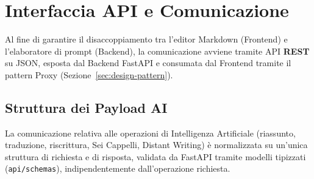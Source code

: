 \section{Interfaccia API e Comunicazione}
\label{sec:interfaccia-api}

Al fine di garantire il disaccoppiamento tra l'editor Markdown (Frontend) e l'elaboratore di prompt (Backend), la comunicazione avviene tramite API \textbf{REST} su JSON, esposta dal Backend FastAPI e consumata dal Frontend tramite il pattern Proxy (Sezione~\ref{sec:design-pattern}).

\subsection{Struttura dei Payload AI}
La comunicazione relativa alle operazioni di Intelligenza Artificiale (riassunto, traduzione, riscrittura, Sei Cappelli, Distant Writing) è normalizzata su un'unica struttura di richiesta e di risposta, validata da FastAPI tramite modelli tipizzati (\texttt{api/schemas}), indipendentemente dall'operazione richiesta.

